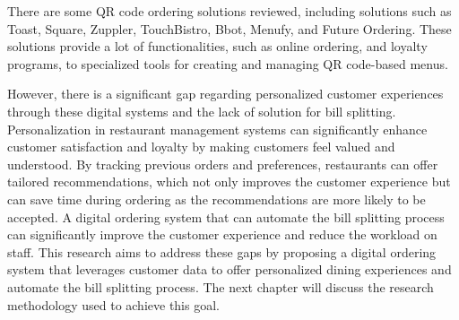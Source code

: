There are some QR code ordering solutions reviewed, including solutions such as Toast, Square, Zuppler, TouchBistro, Bbot, Menufy, and Future Ordering. These solutions provide a lot of functionalities, such as online ordering, and loyalty programs, to specialized tools for creating and managing QR code-based menus. 

However, there is a significant gap regarding personalized customer experiences through these digital systems and the lack of solution for bill splitting. Personalization in restaurant management systems can significantly enhance customer satisfaction and loyalty by making customers feel valued and understood. By tracking previous orders and preferences, restaurants can offer tailored recommendations, which not only improves the customer experience but can save time during ordering as the recommendations are more likely to be accepted. A digital ordering system that can automate the bill splitting process can significantly improve the customer experience and reduce the workload on staff. This research aims to address these gaps by proposing a digital ordering system that leverages customer data to offer personalized dining experiences and automate the bill splitting process. The next chapter will discuss the research methodology used to achieve this goal.



